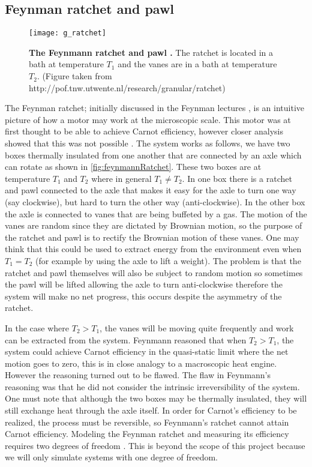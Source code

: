 \subsection{Feynman ratchet and pawl}
\begin{figure}
	\center
	\texttt{[image: g\_ratchet]}
	\caption{\textbf{The Feynmann ratchet and pawl \cite{Feynman1963}.} The ratchet is located in a bath at temperature $T_1$ and the vanes are in a bath at temperature $T_2$.  (Figure taken from http://pof.tnw.utwente.nl/research/granular/ratchet) \label{fig:feynmannRatchet}}
\end{figure}
The Feynman ratchet; initially discussed in the Feynman lectures \cite{Feynman1963}, is an intuitive picture of how a motor may work at the microscopic scale. This motor was at first thought to be able to achieve Carnot efficiency, however closer analysis showed that this was not possible \cite{ParrondoEspanol1996}. The system works as follows, we have two boxes thermally insulated from one another that are connected by an axle which can rotate as shown in \autoref{fig:feynmannRatchet}. These two boxes are at temperature $T_1$ and $T_2$ where in general $T_1 \neq T_2$. In one box there is a ratchet and pawl connected to the axle that makes it easy for the axle to turn one way (say clockwise), but hard to turn the other way (anti-clockwise). In the other box the axle is connected to vanes that are being buffeted by a gas. The motion of the vanes are random since they are dictated by Brownian motion, so the purpose of the ratchet and pawl is to rectify the Brownian motion of these vanes. One may think that this could be used to extract energy from the environment even when $T_1 = T_2$ (for example by using the axle to lift a weight). The problem is that the ratchet and pawl themselves will also be subject to random motion so sometimes the pawl will be lifted allowing the axle to turn anti-clockwise therefore the system will make no net progress, this occurs despite the asymmetry of the ratchet.

In the case where $T_2 > T_1$, the vanes will be moving quite frequently and work can be extracted from the system. Feynmann reasoned that when $T_2 > T_1$, the system could achieve Carnot efficiency in the quasi-static limit where the net motion goes to zero, this is in close analogy to a macroscopic heat engine. However the reasoning turned out to be flawed. The flaw in Feynmann's reasoning  was that he did not consider the intrinsic irreversibility of the system. One must note that although the two boxes may be thermally insulated, they will still exchange heat through the axle itself. In order for Carnot's efficiency to be realized, the process must be reversible, so Feynmann's ratchet cannot attain Carnot efficiency. Modeling the Feynman ratchet and measuring its efficiency requires two degrees of freedom \cite{M.W.Jack2016}. This is beyond the scope of this project because we will only simulate systems with one degree of freedom.

